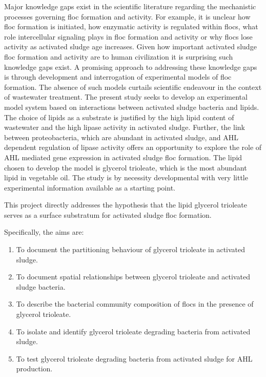 \documentclass[11pt]{article}
\begin{document}
Major knowledge gaps exist in the scientific literature regarding the mechanistic processes governing floc formation and activity. For example, it is unclear how floc formation is initiated, how enzymatic activity is regulated within flocs, what role intercellular signaling plays in floc formation and activity or why flocs lose activity as activated sludge age increases. Given how important activated sludge floc formation and activity are to human civilization it is surprising such knowledge gaps exist. A promising approach to addressing these knowledge gaps is through development and interrogation of experimental models of floc formation. The absence of such models curtails scientific endeavour in the context of wastewater treatment.  
The present study seeks to develop an experimental model system based on interactions between activated sludge bacteria and lipids. The choice of lipids as a substrate is justified by the high lipid content of wastewater and the high lipase activity in activated sludge. Further, the link between proteobacteria, which are abundant in activated sludge, and AHL dependent regulation of lipase activity offers an opportunity to explore the role of AHL mediated gene expression in activated sludge floc formation. The lipid chosen to develop the model is glycerol trioleate, which is the most abundant lipid in vegetable oil. The study is by necessity developmental with very little experimental information available as a starting point.

This project directly addresses the hypothesis that the lipid glycerol trioleate serves as a surface substratum for activated sludge floc formation. 


Specifically, the aims are:
\begin{enumerate}
\item To document the partitioning behaviour of glycerol trioleate in activated sludge.
\item To document spatial relationships between glycerol trioleate and activated sludge bacteria.
\item To describe the bacterial community composition of flocs in the presence of glycerol trioleate.
\item To isolate and identify glycerol trioleate degrading bacteria from activated sludge.
\item To test glycerol trioleate degrading bacteria from activated sludge for AHL production.
\end{enumerate}
\end{document}
